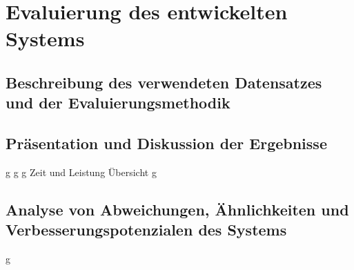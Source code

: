 \chapter{Evaluierung des entwickelten Systems}
\label{chap:evaluierung}

\section{Beschreibung des verwendeten Datensatzes und der Evaluierungsmethodik}
\newpage

\section{Präsentation und Diskussion der Ergebnisse}
\newpage
g
\newpage
g
\newpage
g
\newpage
Zeit und Leistung Übersicht
\newpage
g
\newpage

\section{Analyse von Abweichungen, Ähnlichkeiten und Verbesserungspotenzialen des Systems}
\newpage
g

\newpage
